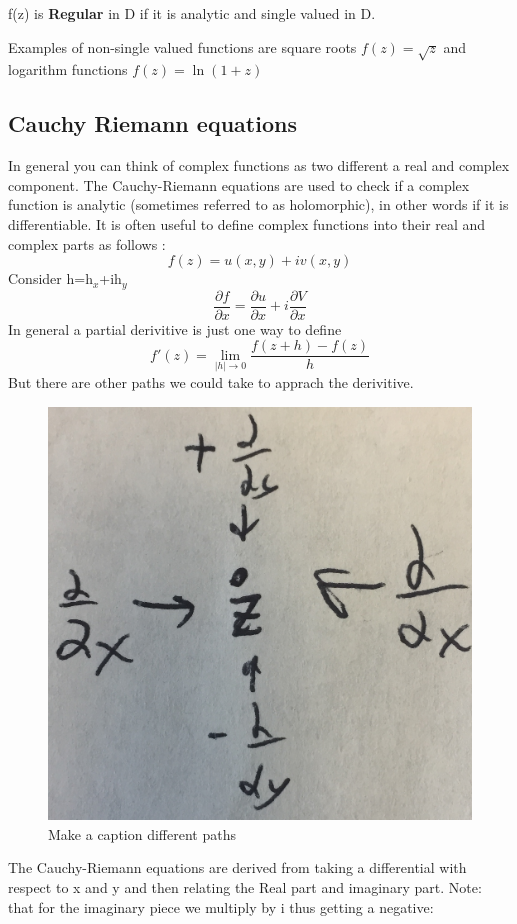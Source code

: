 \documentclass{article}
\newcommand{\be}{\begin{equation}}
\newcommand{\ee}{\end{equation}}
\newcommand{\pd}{\partial}
\begin{document}
f(z) is \textbf{Regular} in D if it is analytic and single valued in D.

Examples of non-single valued functions are square roots
$f(z) = \sqrt{z}$ and logarithm functions $f(z)=\ln{(1+z)}$

\subsection*{Cauchy Riemann equations}
In general you can think of complex functions as two different a real and complex component. 
The Cauchy-Riemann equations are used to check if a complex function is analytic (sometimes referred to as holomorphic), in other words if it is differentiable.
It is often useful to define complex functions into their real and complex parts as follows :
\be
f(z) = u(x,y) + iv(x,y)
\ee
Consider h=h$_x$+ih$_y$
\be
\frac{\pd f}{\pd x} = \frac{\pd u}{\pd x} + i \frac{\pd V}{\pd x}
\ee
In general a partial derivitive is just one way to define
\be
f'(z) = \lim_{|h|\to 0} \frac{f(z+h)-f(z)}{h}
\ee
But there are other paths we could take to apprach the derivitive. 
\begin{figure}[h]
  \centering
  \includegraphics[scale=0.2]{Figures/approach.png}
    \caption{Make a caption different paths}
\end{figure}
The Cauchy-Riemann equations are derived from taking a  differential with respect to x and y  and then relating the Real part and imaginary part. Note: that for the imaginary piece we multiply by i thus getting a negative:
\end{document}
